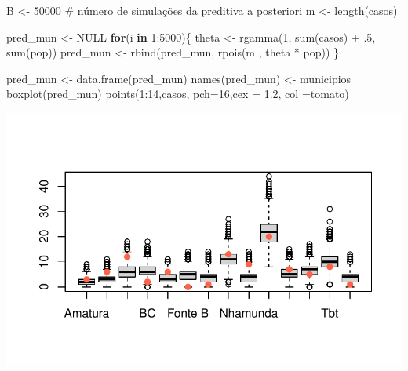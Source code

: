 \documentclass[
  letterpaper,
  DIV=11,
  numbers=noendperiod]{scrreprt}
\newenvironment{Shaded}{\begin{snugshade}}{\end{snugshade}}
\newcommand{\AttributeTok}[1]{\textcolor[rgb]{0.40,0.45,0.13}{#1}}
\newcommand{\CommentTok}[1]{\textcolor[rgb]{0.37,0.37,0.37}{#1}}
\newcommand{\ConstantTok}[1]{\textcolor[rgb]{0.56,0.35,0.01}{#1}}
\newcommand{\ControlFlowTok}[1]{\textcolor[rgb]{0.00,0.23,0.31}{\textbf{#1}}}
\newcommand{\DecValTok}[1]{\textcolor[rgb]{0.68,0.00,0.00}{#1}}
\newcommand{\FloatTok}[1]{\textcolor[rgb]{0.68,0.00,0.00}{#1}}
\newcommand{\FunctionTok}[1]{\textcolor[rgb]{0.28,0.35,0.67}{#1}}
\newcommand{\NormalTok}[1]{\textcolor[rgb]{0.00,0.23,0.31}{#1}}
\newcommand{\OtherTok}[1]{\textcolor[rgb]{0.00,0.23,0.31}{#1}}
\newcommand{\SpecialCharTok}[1]{\textcolor[rgb]{0.37,0.37,0.37}{#1}}
\newcommand{\StringTok}[1]{\textcolor[rgb]{0.13,0.47,0.30}{#1}}
\theoremstyle{plain}
\theoremstyle{definition}
\theoremstyle{definition}
\theoremstyle{remark}
\begin{document}
\begin{Shaded}
\begin{Highlighting}[]
\NormalTok{B }\OtherTok{\textless{}{-}} \DecValTok{50000} \CommentTok{\# número de simulações da preditiva a posteriori}
\NormalTok{m }\OtherTok{\textless{}{-}} \FunctionTok{length}\NormalTok{(casos)}

\NormalTok{pred\_mun }\OtherTok{\textless{}{-}} \ConstantTok{NULL}
\ControlFlowTok{for}\NormalTok{(i }\ControlFlowTok{in} \DecValTok{1}\SpecialCharTok{:}\DecValTok{5000}\NormalTok{)\{}
\NormalTok{  theta }\OtherTok{\textless{}{-}} \FunctionTok{rgamma}\NormalTok{(}\DecValTok{1}\NormalTok{, }\FunctionTok{sum}\NormalTok{(casos) }\SpecialCharTok{+}\NormalTok{ .}\DecValTok{5}\NormalTok{, }\FunctionTok{sum}\NormalTok{(pop))}
\NormalTok{  pred\_mun }\OtherTok{\textless{}{-}} \FunctionTok{rbind}\NormalTok{(pred\_mun, }\FunctionTok{rpois}\NormalTok{(m , theta }\SpecialCharTok{*}\NormalTok{ pop))}
\NormalTok{\}}

\NormalTok{pred\_mun }\OtherTok{\textless{}{-}} \FunctionTok{data.frame}\NormalTok{(pred\_mun)}
\FunctionTok{names}\NormalTok{(pred\_mun) }\OtherTok{\textless{}{-}}\NormalTok{ municipios}
\FunctionTok{boxplot}\NormalTok{(pred\_mun)}
\FunctionTok{points}\NormalTok{(}\DecValTok{1}\SpecialCharTok{:}\DecValTok{14}\NormalTok{,casos, }\AttributeTok{pch=}\DecValTok{16}\NormalTok{,}\AttributeTok{cex =} \FloatTok{1.2}\NormalTok{, }\AttributeTok{col =}\StringTok{\textquotesingle{}tomato\textquotesingle{}}\NormalTok{)}
\end{Highlighting}
\end{Shaded}

\includegraphics{poisson_files/figure-pdf/unnamed-chunk-3-1.pdf}
\end{document}
